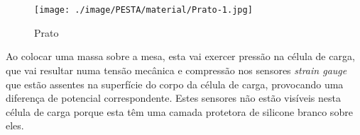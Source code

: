 \\
\\
\begin{minipage}[!b]{\linewidth}
\begin{figure}[H]
	\centering
	\texttt{[image: ./image/PESTA/material/Prato-1.jpg]}
	\caption{Prato}
	\label{Prato}
\end{figure}
\end{minipage}
Ao colocar uma massa sobre a mesa, esta vai exercer pressão na célula de carga, que vai resultar numa tensão mecânica e compressão nos sensores \textit{strain gauge} que estão assentes na superfície do corpo da célula de carga, provocando uma diferença de potencial correspondente. Estes sensores não estão visíveis nesta célula de carga porque esta têm uma camada protetora de silicone branco sobre eles.
